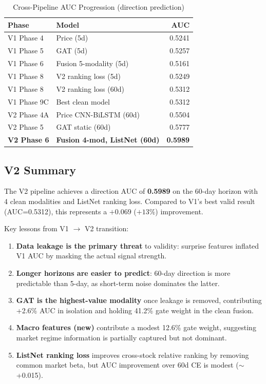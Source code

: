 \documentclass[12pt,a4paper]{article}
\begin{document}
\begin{table}[H]
\centering
\caption{Cross-Pipeline AUC Progression (direction prediction)}
\begin{tabular}{llr}
\toprule
\textbf{Phase} & \textbf{Model} & \textbf{AUC} \\
\midrule
V1 Phase 4 & Price (5d)                  & 0.5241 \\
V1 Phase 5 & GAT (5d)                    & 0.5257 \\
V1 Phase 6 & Fusion 5-modality (5d)      & 0.5161 \\
V1 Phase 8 & V2 ranking loss (5d)        & 0.5249 \\
V1 Phase 8 & V2 ranking loss (60d)       & 0.5312 \\
V1 Phase 9C & Best clean model           & 0.5312 \\
\midrule
V2 Phase 4A & Price CNN-BiLSTM (60d)     & 0.5504 \\
V2 Phase 5  & GAT static (60d)           & 0.5777 \\
\textbf{V2 Phase 6} & \textbf{Fusion 4-mod, ListNet (60d)} & \textbf{0.5989} \\
\bottomrule
\end{tabular}
\end{table}

\subsection{V2 Summary}

The V2 pipeline achieves a direction AUC of \textbf{0.5989} on the 60-day horizon
with 4 clean modalities and ListNet ranking loss. Compared to V1's best valid result
(AUC=0.5312), this represents a $+0.069$ ($+13\%$) improvement.

Key lessons from V1 $\to$ V2 transition:
\begin{enumerate}
    \item \textbf{Data leakage is the primary threat} to validity: surprise features inflated V1
          AUC by masking the actual signal strength.
    \item \textbf{Longer horizons are easier to predict}: 60-day direction is more predictable
          than 5-day, as short-term noise dominates the latter.
    \item \textbf{GAT is the highest-value modality} once leakage is removed, contributing
          +2.6\% AUC in isolation and holding 41.2\% gate weight in the clean fusion.
    \item \textbf{Macro features (new)} contribute a modest 12.6\% gate weight,
          suggesting market regime information is partially captured but not dominant.
    \item \textbf{ListNet ranking loss} improves cross-stock relative ranking by removing
          common market beta, but AUC improvement over 60d CE is modest ($\sim$+0.015).
\end{enumerate}
\end{document}
